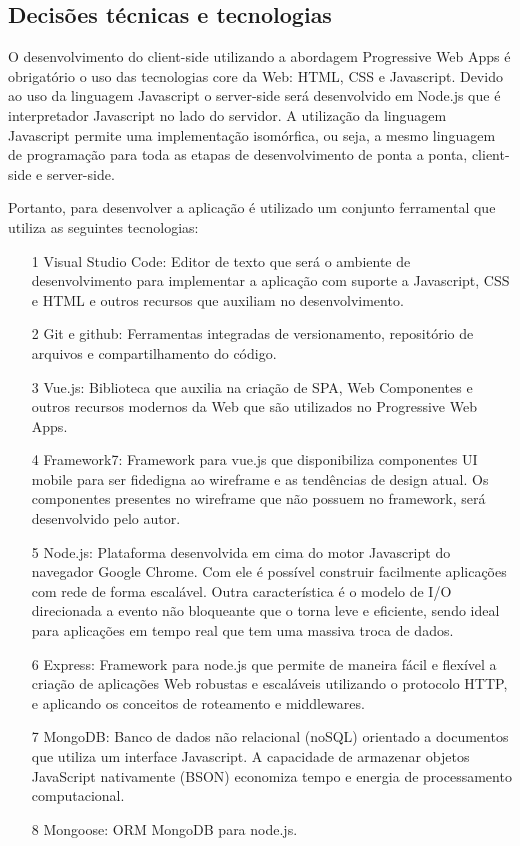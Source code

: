\subsection{\esp Decisões técnicas e tecnologias}

O desenvolvimento do client-side utilizando a abordagem Progressive Web Apps é obrigatório o uso das tecnologias core da Web: HTML, CSS e Javascript. Devido ao uso da linguagem Javascript o server-side será desenvolvido em Node.js que é interpretador Javascript no lado do servidor. A utilização da linguagem Javascript permite uma implementação isomórfica, ou seja, a mesmo linguagem de programação para toda as etapas de desenvolvimento de ponta a ponta, client-side e server-side.

Portanto, para desenvolver a aplicação é utilizado um conjunto ferramental que utiliza as seguintes tecnologias:

\begin{enumerate}
	\item [1] Visual Studio Code: Editor de texto que será o ambiente de desenvolvimento para implementar a  aplicação com suporte a Javascript, CSS e HTML e outros recursos que auxiliam no desenvolvimento.
	\item [2] Git e github: Ferramentas integradas de versionamento, repositório de arquivos e compartilhamento do código.
	\item [3] Vue.js: Biblioteca que auxilia na criação de SPA, Web Componentes e outros recursos modernos da Web que são utilizados no Progressive Web Apps.
	\item [4] Framework7: Framework para vue.js que disponibiliza componentes UI mobile para ser fidedigna ao wireframe e as tendências de design atual. Os componentes presentes no wireframe que não possuem no framework, será desenvolvido pelo autor.
	\item [5] Node.js: Plataforma desenvolvida em cima do motor Javascript do navegador Google Chrome. Com ele é possível construir facilmente aplicações com rede de forma escalável. Outra característica é o modelo de I/O direcionada a evento não bloqueante que o torna leve e eficiente, sendo ideal para aplicações em tempo real que tem uma massiva troca de dados.
	\item [6] Express:  Framework para node.js que permite de maneira fácil e flexível a criação de aplicações Web robustas e escaláveis utilizando o protocolo HTTP, e aplicando os conceitos de roteamento e middlewares.
	\item [7] MongoDB: Banco de dados não relacional (noSQL) orientado a documentos que utiliza um interface Javascript. A capacidade de armazenar objetos JavaScript nativamente (BSON) economiza tempo e energia de processamento computacional.
	\item [8] Mongoose: ORM MongoDB para node.js.

\end{enumerate}


